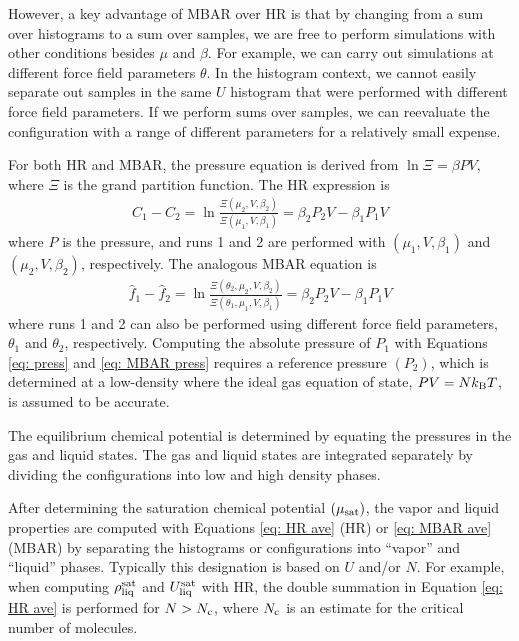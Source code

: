 \documentclass[journal=jced,manuscript=article]{achemso}
\begin{document}
However, a key advantage of MBAR over HR is that by changing from a sum over histograms to a sum over samples, we are free to perform simulations with other conditions besides $\mu$ and $\beta$. For example, we can carry out simulations at different force field parameters $\theta$. In the histogram context, we cannot easily separate out samples in the same $U$ histogram that were performed with different force field parameters. If we perform sums over samples, we can reevaluate the configuration with a range of different parameters for a relatively small expense.

For both HR and MBAR, the pressure equation is derived from $\ln \Xi = \beta P V$, where $\Xi$ is the grand partition function. The HR expression is
\begin{eqnarray} \label{eq: press}
C_1 - C_2 = \ln \frac{\Xi (\mu_2,V,\beta_2)}{\Xi (\mu_1,V,\beta_1)} = \beta_2 P_2 V - \beta_1 P_1 V
\end{eqnarray}
where $P$ is the pressure, and runs 1 and 2 are performed with $(\mu_1, V, \beta_1)$ and $(\mu_2, V, \beta_2)$, respectively. The analogous MBAR equation is
\begin{eqnarray} \label{eq: MBAR press}
\hat f_1 - \hat f_2 = \ln \frac{\Xi (\theta_2,\mu_2,V,\beta_2)}{\Xi (\theta_1,\mu_1,V,\beta_1)} = \beta_2 P_2 V - \beta_1 P_1 V
\end{eqnarray}
where runs 1 and 2 can also be performed using different force field parameters, $\theta_1$ and $\theta_2$, respectively. Computing the absolute pressure of $P_1$ with Equations \ref{eq: press} and \ref{eq: MBAR press} requires a reference pressure $(P_2)$, which is determined at a low-density where the ideal gas equation of state, $P V = N k_{\rm B} T$, is assumed to be accurate.

The equilibrium chemical potential is determined by equating the pressures in the gas and liquid states. The gas and liquid states are integrated separately by dividing the configurations into low and high density phases. 

After determining the saturation chemical potential $(\mu_{\rm sat})$, the vapor and liquid properties are computed with Equations \ref{eq: HR ave} (HR) or \ref{eq: MBAR ave} (MBAR) by separating the histograms or configurations into ``vapor'' and ``liquid'' phases. Typically this designation is based on $U$ and/or $N$. For example, when computing $\rho_{\rm liq}^{\rm sat}$ and $U_{\rm liq}^{\rm sat}$ with HR, the double summation in Equation \ref{eq: HR ave} is performed for $N > N_{\rm c}$, where $N_{\rm c}$ is an estimate for the critical number of molecules.
\end{document}
